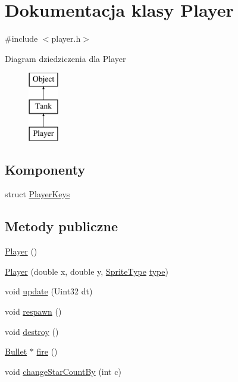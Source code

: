 \hypertarget{class_player}{}\section{Dokumentacja klasy Player}
\label{class_player}


{\ttfamily \#include $<$player.\+h$>$}

Diagram dziedziczenia dla Player\begin{figure}[H]
\begin{center}
\leavevmode
\includegraphics[height=3.000000cm]{class_player}
\end{center}
\end{figure}
\subsection*{Komponenty}
\begin{DoxyCompactItemize}
\item 
struct \hyperlink{struct_player_1_1_player_keys}{Player\+Keys}
\end{DoxyCompactItemize}
\subsection*{Metody publiczne}
\begin{DoxyCompactItemize}
\item 
\hyperlink{class_player_affe0cc3cb714f6deb4e62f0c0d3f1fd8}{Player} ()
\item 
\hyperlink{class_player_abea91b1e21cd330be03345417b9e6f2d}{Player} (double x, double y, \hyperlink{type_8h_ac6fa10729dffeb6a192492f13c25e31a}{Sprite\+Type} \hyperlink{class_object_a1b89f32cd9e0040f8a2455f3cef7d0d2}{type})
\item 
void \hyperlink{class_player_af5cac4f8c62903d39c7dc7bdf8f05ddb}{update} (Uint32 dt)
\item 
void \hyperlink{class_player_a038a74bd768b6eec8fbe57cb2bacf811}{respawn} ()
\item 
void \hyperlink{class_player_acb40d0a5d388029d48156fb06fdd288c}{destroy} ()
\item 
\hyperlink{class_bullet}{Bullet} $\ast$ \hyperlink{class_player_a5f0f389fdf5d685f088a997ed5af925d}{fire} ()
\item 
void \hyperlink{class_player_aa7495c2cb4ba4f197f0d6228970de75b}{change\+Star\+Count\+By} (int c)
\end{DoxyCompactItemize}
